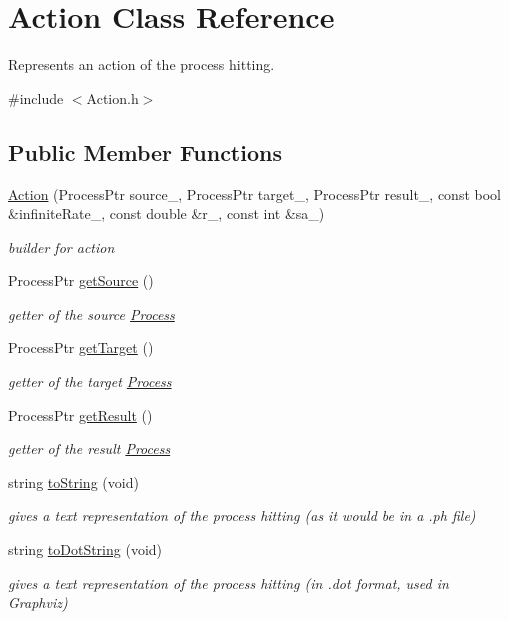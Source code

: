 \hypertarget{class_action}{\section{\-Action \-Class \-Reference}
\label{class_action}
}


\-Represents an action of the process hitting.  




{\ttfamily \#include $<$\-Action.\-h$>$}

\subsection*{\-Public \-Member \-Functions}
\begin{DoxyCompactItemize}
\item 
\hyperlink{class_action_a813d7e506bed06d58988b8efa46371c7}{\-Action} (\-Process\-Ptr source\-\_\-, \-Process\-Ptr target\-\_\-, \-Process\-Ptr result\-\_\-, const bool \&infinite\-Rate\-\_\-, const double \&r\-\_\-, const int \&sa\-\_\-)
\begin{DoxyCompactList}\small\item\em builder for action \end{DoxyCompactList}\item 
\-Process\-Ptr \hyperlink{class_action_a19ce83cb05f0823e2426549108b29c55}{get\-Source} ()
\begin{DoxyCompactList}\small\item\em getter of the source \hyperlink{class_process}{\-Process} \end{DoxyCompactList}\item 
\-Process\-Ptr \hyperlink{class_action_a1a6bbe7a883a55d0c446ec5e23ae36d6}{get\-Target} ()
\begin{DoxyCompactList}\small\item\em getter of the target \hyperlink{class_process}{\-Process} \end{DoxyCompactList}\item 
\-Process\-Ptr \hyperlink{class_action_ad2f1969b3f50dd235000c6788a978ba0}{get\-Result} ()
\begin{DoxyCompactList}\small\item\em getter of the result \hyperlink{class_process}{\-Process} \end{DoxyCompactList}\item 
string \hyperlink{class_action_a0dfc2e29fbaca7c75d60fd3cd8582052}{to\-String} (void)
\begin{DoxyCompactList}\small\item\em gives a text representation of the process hitting (as it would be in a .ph file) \end{DoxyCompactList}\item 
string \hyperlink{class_action_aa38afb2bcdc765b8e905a8c0af68b7a8}{to\-Dot\-String} (void)
\begin{DoxyCompactList}\small\item\em gives a text representation of the process hitting (in .dot format, used in \-Graphviz) \end{DoxyCompactList}\end{DoxyCompactItemize}
